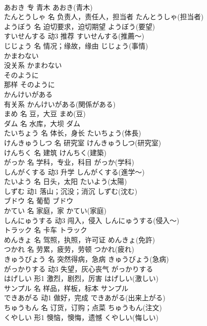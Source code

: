 \documentclass[8pt]{extreport}
\begin{document}
\begin{CJK}{UTF8}{min}
\\	あおき	专	青木	あおき(青木)	
\\	たんとうしゃ	名	负责人，责任人，担当者	たんとうしゃ(担当者)	
\\	ようぼう	名	迫切要求，迫切期望	ようぼう(要望)	
\\	すいせんする	动3	推荐	すいせんする(推薦～)	
\\	じじょう	名	情况；缘故，缘由	じじょう(事情)	
\\	かまわない	
\\	没关系	かまわない	
\\	そのように	
\\	那样	そのように	
\\	かんけいがある	
\\	有关系	かんけいがある(関係がある)	
\\	まめ	名	豆，大豆	まめ(豆)	
\\	ダム	名	水库，大坝	ダム	
\\	たいちょう	名	体长，身长	たいちょう(体長)	
\\	けんきゅうしつ	名	研究室	けんきゅうしつ(研究室)	
\\	けんちく	名	建筑	けんちく(建築)	
\\	がっか	名	学科，专业，科目	がっか(学科)	
\\	しんがくする	动3	升学	しんがくする(進学～)	
\\	たいよう	名	日头，太阳	たいよう(太陽)	
\\	しずむ	动1	落山；沉没；消沉	しずむ(沈む)	
\\	ブドウ	名	葡萄	ブドウ	
\\	かてい	名	家庭，家	かてい(家庭)	
\\	しんにゅうする	动3	闯入，侵入	しんにゅうする(侵入～)	
\\	トラック	名	卡车	トラック	
\\	めんきょ	名	驾照，执照，许可证	めんきょ(免許)	
\\	つかれ	名	劳累，疲劳，劳顿	つかれ(疲れ)	
\\	きゅうびょう	名	突然得病，急病	きゅうびょう(急病)	
\\	がっかりする	动3	失望，灰心丧气	がっかりする	
\\	はげしい	形1	激烈，剧烈，厉害	はげしい(激しい)	
\\	サンプル	名	样品，样板，标本	サンプル	
\\	できあがる	动1	做好，完成	できあがる(出来上がる)	
\\	ちゅうもん	名	订货，订购；点菜	ちゅうもん(注文)	
\\	くやしい	形1	懊恼，懊悔，遗憾	くやしい(悔しい)	

\end{CJK}
\end{document}
